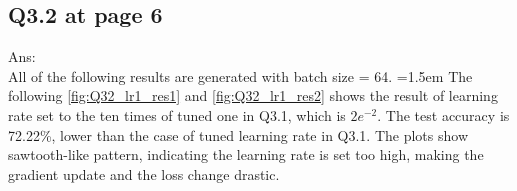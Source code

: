 \documentclass{article}
\begin{document}
	\newpage
	\subsection*{Q3.2 at page 6}
	Ans:\\
	All of the following results are generated with batch size = 64.\newline
	\hangindent=1.5em \hspace{1.5em} The following \autoref{fig:Q32_lr1_res1} and \autoref{fig:Q32_lr1_res2} shows the result of learning rate set to the ten times of tuned one in Q3.1, which is $2e^{-2}$. The test accuracy is 72.22\%, lower than the case of tuned learning rate in Q3.1. The plots show sawtooth-like pattern, indicating the learning rate is set too high, making the gradient update and the loss change drastic.
	\newline	
\end{document}
